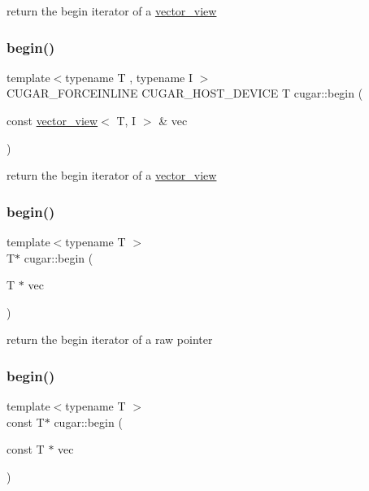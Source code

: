 return the begin iterator of a \hyperlink{structcugar_1_1vector__view}{vector\+\_\+view} \mbox{\label{group___basic_gaa17977f6372733018b655cafd4a73fea}} 
\subsubsection{\texorpdfstring{begin()}{begin()}\hspace{0.1cm}{\footnotesize\ttfamily [2/4]}}
{\footnotesize\ttfamily template$<$typename T , typename I $>$ \\
C\+U\+G\+A\+R\+\_\+\+F\+O\+R\+C\+E\+I\+N\+L\+I\+NE C\+U\+G\+A\+R\+\_\+\+H\+O\+S\+T\+\_\+\+D\+E\+V\+I\+CE T cugar\+::begin (\begin{DoxyParamCaption}\item[{const \hyperlink{structcugar_1_1vector__view}{vector\+\_\+view}$<$ T, I $>$ \&}]{vec }\end{DoxyParamCaption})}

return the begin iterator of a \hyperlink{structcugar_1_1vector__view}{vector\+\_\+view} \mbox{\label{group___basic_ga26acbb08b64652358a9b55c16f4f9f97}} 
\subsubsection{\texorpdfstring{begin()}{begin()}\hspace{0.1cm}{\footnotesize\ttfamily [3/4]}}
{\footnotesize\ttfamily template$<$typename T $>$ \\
T$\ast$ cugar\+::begin (\begin{DoxyParamCaption}\item[{T $\ast$}]{vec }\end{DoxyParamCaption})}

return the begin iterator of a raw pointer \mbox{\label{group___basic_gab258fa2242425e638b3014c9ce667ed5}} 
\subsubsection{\texorpdfstring{begin()}{begin()}\hspace{0.1cm}{\footnotesize\ttfamily [4/4]}}
{\footnotesize\ttfamily template$<$typename T $>$ \\
const T$\ast$ cugar\+::begin (\begin{DoxyParamCaption}\item[{const T $\ast$}]{vec }\end{DoxyParamCaption})}

